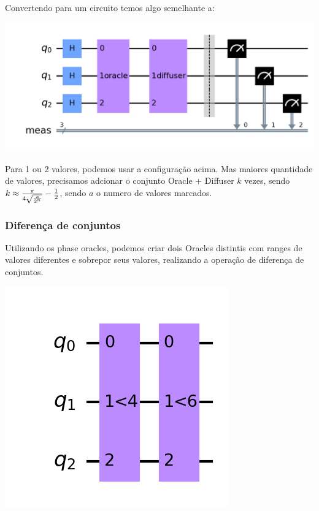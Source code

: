 \documentclass{article}
\begin{document}
Convertendo para um circuito temos algo semelhante a:


\begin{center}
	\includegraphics[scale=0.3]{Grover.png}
	\label{fig:grover-default-circuit}
\end{center}

Para 1 ou 2 valores, podemos usar a configuração acima. Mas maiores quantidade de valores, precisamos adcionar o conjunto Oracle + Diffuser $k$ vezes, sendo $k \approx { {\pi \over {4 \sqrt{a\over{2^n}}}} - {1\over2}  }$, sendo $a$ o numero de valores marcados.

\subsubsection{Diferença de conjuntos}

Utilizando os phase oracles, podemos criar dois Oracles distintis com ranges de valores diferentes e sobrepor seus valores, realizando a operação de diferença de conjuntos.

\begin{center}
	\includegraphics[scale=0.3]{less_than.png}
	\label{fig:less-than-circuit}
\end{center}
\end{document}
